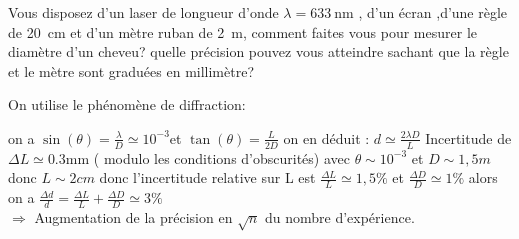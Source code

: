 \begin{Exercise}[title=Mesure du diamètre d'un cheveux]
Vous disposez d'un laser de longueur d'onde $\lambda=\SI{633}{\nano\meter}$ , d'un écran ,d'une règle de \SI{20}{\centi\meter} et d'un mètre ruban de \SI{2}{\meter}, comment faites vous pour mesurer le diamètre d'un cheveu?  quelle précision pouvez vous atteindre sachant que la règle et le mètre sont graduées en millimètre?
\end{Exercise}
\begin{Answer}
On utilise le phénomène de diffraction:
\begin{center}
	\end{center}
on a $\sin(\theta)=\frac{\lambda}{D} \simeq 10^{-3} $et $\tan(\theta)=\frac{L}{2D}$ on en déduit : $d \simeq \frac{2\lambda D}{L}$
Incertitude de $\Delta L \simeq 0.3$mm ( modulo les conditions d'obscurités) avec $\theta \sim 10^{-3}$ et $D \sim 1,5m$ donc $L \sim 2cm$
donc l'incertitude relative sur L est $\frac{\Delta L }{L} \simeq 1,5\%$ et $\frac{\Delta D}{D} \simeq 1\%$
alors on a $\frac{\Delta d}{d} = \frac{\Delta L}{L} +\frac{\Delta D}{D} \simeq 3\%$\\
$\Rightarrow$ Augmentation de la précision en $\sqrt{n}$ du nombre d'expérience.
\end{Answer}
